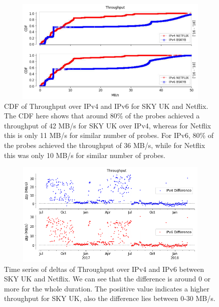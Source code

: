 \begin{figure}[!ht]
	\centering
	\includegraphics[keepaspectratio, height=5cm, width=15cm]{figures/cache/bskyb/netflix-throughput-difference-5607-separate.pdf}
	\caption[SKY UK Throughput CDF Absolute]{CDF of Throughput over IPv4 and IPv6 for SKY UK and Netflix. The CDF here shows that around 80\% of the probes achieved a throughput of 42 MB/s for SKY UK over IPv4, whereas for Netflix this is only 11 MB/s
for similar number of probes. For IPv6, 80\% of the probes achieved the throughput of 36 MB/s, while for Netflix this was only 10 MB/s for similar number of probes.}
	\label{fig:SKY UK Throughput CDF Absolute}
\end{figure}

\FloatBarrier

\begin{figure}[!ht]
	\centering
	\includegraphics[keepaspectratio, height=5cm, width=15cm]{figures/cache/bskyb/netflix-throughput-timeseries-asn-5607.png}
	\caption[SKY UK Throughput Timeseries Deltas]{Time series of deltas of Throughput over IPv4 and IPv6 between SKY UK and Netflix. We can see that the difference is around 0 or more for the whole duration. 
The posiitive value indicates a higher throughput for SKY UK, also the difference lies between 0-30 MB/s.}
	\label{fig:SKY UK Throughput Timeseries Deltas}
\end{figure}

